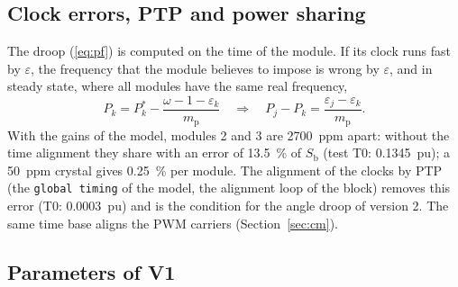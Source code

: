 \documentclass[11pt,a4paper]{scrartcl}
\newcommand{\ped}[1]{_{\mathrm{#1}}}
\newcommand{\code}[1]{\texttt{#1}}
\begin{document}
\begin{onehalfspace}
\subsection{Clock errors, PTP and power sharing}
\label{sec:clock}

The droop (\ref{eq:pf}) is computed on the time of the module. If its clock runs fast by $\varepsilon$, the frequency that the module believes to impose is wrong by $\varepsilon$, and in steady state, where all modules have the same real frequency,
\begin{equation}
	P_k = P^*_k - \frac{\omega - 1 - \varepsilon_k}{m\ped{p}}
	\quad\Rightarrow\quad
	P_j - P_k = \frac{\varepsilon_j - \varepsilon_k}{m\ped{p}} .
	\label{eq:clock}
\end{equation}
With the gains of the model, modules 2 and 3 are \SI{2700}{ppm} apart: without the time alignment they share with an error of \SI{13.5}{\percent} of $S\ped{b}$ (test T0: \SI{0.1345}{pu}); a \SI{50}{ppm} crystal gives \SI{0.25}{\percent} per module. The alignment of the clocks by PTP (the \code{global timing} of the model, the alignment loop of the block) removes this error (T0: \SI{0.0003}{pu}) and is the condition for the angle droop of version 2. The same time base aligns the PWM carriers (Section~\ref{sec:cm}).

\subsection{Parameters of V1}


\end{onehalfspace}
\end{document}
